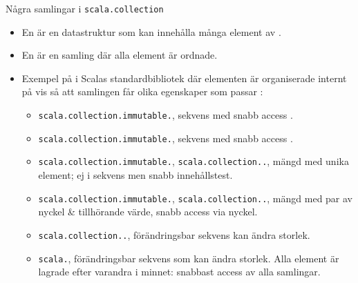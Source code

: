 \begin{Slide}{Några samlingar i \texttt{scala.collection}}\SlideFontSmall
\SlideOnly{\setlength{\leftmargini}{0pt}}
\begin{itemize}
\item En   är en datastruktur som kan innehålla många element av .
\item En   är en samling där alla element är ordnade.

\item Exempel på  i Scalas standardbibliotek där elementen är organiserade  internt på  vis så att samlingen får olika egenskaper som passar :
\begin{itemize}\SlideFontTiny
\item \texttt{scala.collection.immutable.}, sekvens med snabb access .
\item \texttt{scala.collection.immutable.}, sekvens med snabb access .
\item \texttt{scala.collection.immutable.}, \texttt{scala.collection..}, mängd med unika element; ej i sekvens men snabb innehållstest.
\item \texttt{scala.collection.immutable.}, \texttt{scala.collection..}, mängd med par av nyckel \& tillhörande värde, snabb access via nyckel.
\item \texttt{scala.collection..}, förändringsbar sekvens kan ändra storlek.
\item \texttt{scala.}, förändringsbar sekvens som  kan ändra storlek. Alla element är lagrade efter varandra i minnet: snabbast access av alla samlingar.
\end{itemize}
\end{itemize}
\end{Slide}


